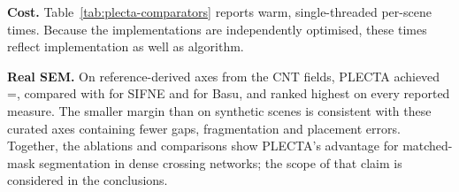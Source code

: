 \textbf{Cost.} Table~\ref{tab:plecta-comparators} reports warm,
single-threaded per-scene times. Because the implementations are independently
optimised, these times reflect implementation as well as algorithm.

\textbf{Real SEM.} On reference-derived axes from the
\PlectaRealFieldCountLower{} CNT fields, PLECTA achieved
\Fone{}=\PlectaRealManualFOneMean{}, compared with
\PlectaRealSifneFOneMean{} for SIFNE and \PlectaRealBasuFOneMean{} for Basu,
and ranked highest on every reported measure. The smaller margin than on
synthetic scenes is consistent with these curated axes containing fewer gaps,
fragmentation and placement errors. Together, the ablations and comparisons
show PLECTA's advantage for matched-mask segmentation in dense crossing
networks; the scope of that claim is considered in the conclusions.

